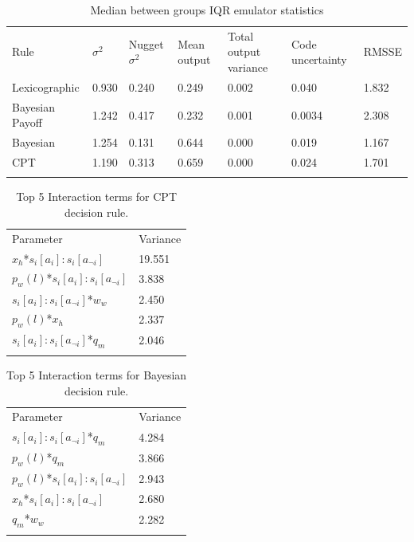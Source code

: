 \documentclass[graybox]{svmult}
\begin{document}
\begin{table}[H]
\caption{Median between groups IQR emulator statistics \label{tab:sa_emulator_iqr}}
\begin{tabular} {lllllll}
\hline\noalign{\smallskip}
Rule & \(\sigma^2\) & Nugget \(\sigma^2\) & Mean output & Total output variance & Code uncertainty & RMSSE \\
\noalign{\smallskip}\svhline\noalign{\smallskip}
Lexicographic & 0.930 & 0.240 & 0.249 & 0.002 & 0.040 & 1.832 \\
Bayesian Payoff & 1.242 & 0.417 & 0.232 & 0.001 & 0.0034 & 2.308 \\
Bayesian & 1.254 & 0.131 & 0.644 & 0.000 & 0.019 & 1.167 \\
\ac{CPT} & 1.190 & 0.313 & 0.659 & 0.000 & 0.024 & 1.701 \\
\noalign{\smallskip}\hline\noalign{\smallskip}
\end{tabular}
\end{table}

\begin{table}[h]
\caption{Top 5 Interaction terms for \ac{CPT} decision rule.}
\label{tab:sa_interaction_prospect_group_iqr}
\begin{tabular} {ll}
\hline\noalign{\smallskip}
Parameter & Variance \\ 
\noalign{\smallskip}\svhline\noalign{\smallskip}

\(x_{h}\)*\(s_{i}[a_{i}]:s_{i}[a_{\neg i}]\) & 19.551\\
\(p_{w}(l)\)*\(s_{i}[a_{i}]:s_{i}[a_{\neg i}]\) & 3.838\\
\(s_{i}[a_{i}]:s_{i}[a_{\neg i}]\)*\(w_{w}\) & 2.450\\
\(p_{w}(l)\)*\(x_{h}\) & 2.337\\
\(s_{i}[a_{i}]:s_{i}[a_{\neg i}]\)*\(q_{m}\) & 2.046\\
\noalign{\smallskip}\hline\noalign{\smallskip}
\end{tabular}
\end{table}

\begin{table}[H]
\caption{Top 5 Interaction terms for Bayesian decision rule. \label{tab:sa_interaction_sharing_group_iqr}}
\begin{tabular} {ll}
\hline\noalign{\smallskip}
Parameter & Variance \\
\noalign{\smallskip}\svhline\noalign{\smallskip}
\(s_{i}[a_{i}]:s_{i}[a_{\neg i}]\)*\(q_{m}\) & 4.284\\
\(p_{w}(l)\)*\(q_{m}\) & 3.866\\
\(p_{w}(l)\)*\(s_{i}[a_{i}]:s_{i}[a_{\neg i}]\) & 2.943\\
\(x_{h}\)*\(s_{i}[a_{i}]:s_{i}[a_{\neg i}]\) & 2.680\\
\(q_{m}\)*\(w_{w}\) & 2.282\\
\noalign{\smallskip}\hline\noalign{\smallskip}
\end{tabular}
\end{table}
\end{document}
